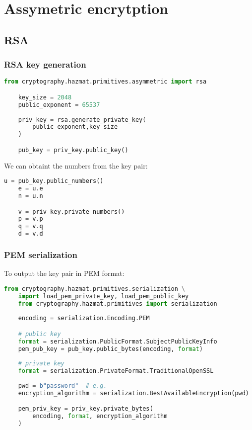 \documentclass[a4paper, 12 pt]{memoir}
\begin{document}
\chapter{Assymetric encrytption}

\section{RSA}

\subsection{RSA key generation}
\begin{lstlisting}[language=Python]
    from cryptography.hazmat.primitives.asymmetric import rsa

    key_size = 2048
    public_exponent = 65537
    
    priv_key = rsa.generate_private_key(
        public_exponent,key_size
    )

    pub_key = priv_key.public_key()
\end{lstlisting}

We can obtaint the numbers from the key pair:
\begin{lstlisting}[language=Python]
    u = pub_key.public_numbers()
    e = u.e
    n = u.n

    v = priv_key.private_numbers()
    p = v.p
    q = v.q
    d = v.d
\end{lstlisting}

\subsection{PEM serialization}
To output the key pair in PEM format:
\begin{lstlisting}[language=Python]
    from cryptography.hazmat.primitives.serialization \
    import load_pem_private_key, load_pem_public_key
    from cryptography.hazmat.primitives import serialization
    
    encoding = serialization.Encoding.PEM

    # public key
    format = serialization.PublicFormat.SubjectPublicKeyInfo
    pem_pub_key = pub_key.public_bytes(encoding, format)
    
    # private key
    format = serialization.PrivateFormat.TraditionalOpenSSL
    
    pwd = b"password"  # e.g.
    encryption_algorithm = serialization.BestAvailableEncryption(pwd)

    pem_priv_key = priv_key.private_bytes(
        encoding, format, encryption_algorithm
    )
\end{lstlisting}
\end{document}
